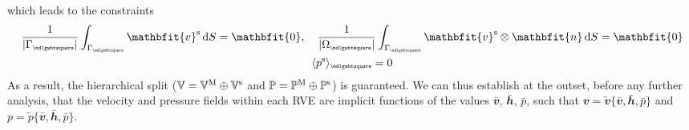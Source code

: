 \documentclass[12pt,a4paper]{article}
\renewcommand{\ta}[1]{\mathbfit{#1}}
\renewcommand{\ts}[1]{\mathbfit{#1}}
\renewcommand{\Box}{\mdlgwhtsquare}
\DeclarePairedDelimiter{\homgen}{\langle}{\rangle_\rve}
\newcommand{\volume}{|\Omega_\rve|}
\newcommand{\rve}{
  {\mathchoice
   {\mbox{\scalebox{0.67}{$\Box$}}}
   {\mbox{\scalebox{0.67}{$\Box$}}}
   {\mbox{\scalebox{0.5}{$\Box$}}}
   {\mbox{\scalebox{0.375}{$\Box$}}}
  }
}
\begin{document}
which leads to the constraints
\begin{subequations}\label{eq13}
\begin{gather}
    \frac{1}{|\Gamma_\rve|} \int_{\Gamma_\rve} \ta v^\fluct \dif S = \ta 0, \quad
    \frac{1}{\volume} \int_{\Gamma_\rve} \ta v^\fluct \outerp \ta n \dif S = \ts 0
\label{eq13a} \\
    \homgen{p^\fluct} = 0
\label{eq13b}
\end{gather}
\end{subequations}
As a result, the hierarchical split ($\mathbb{V} = \mathbb{V}^{\mathrm{M}} \oplus \mathbb{V}^{\mathrm{s}}$ and $\mathbb{P} = \mathbb{P}^{\mathrm{M}} \oplus \mathbb{P}^{\mathrm{s}}$) is guaranteed.
We can thus establish at the outset, before any further analysis, that the velocity and pressure fields within each RVE are implicit functions of the values $\bar{\ta v}$, $\bar{\ts h}$, $\bar{p}$, such that $\ta v = \tilde{\ta v}\{\bar{\ta v}, \bar{\ts h}, \bar{p}\}$ and $p = \tilde{p}\{\bar{\ta v}, \bar{\ts h}, \bar{p}\}$.
\end{document}
